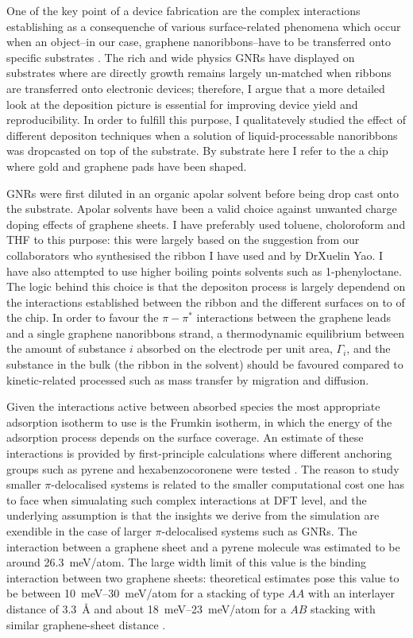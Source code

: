 One of the key point of a device fabrication are the complex interactions establishing as a consequenche of various surface-related phenomena which occur when an object--in our case, graphene nanoribbons--have to be transferred onto specific substrates \cite{nerngchamnong2013role, huskens2004model}. The rich and wide physics \glspl{GNR} have displayed on substrates where are directly growth remains largely un-matched when ribbons are transferred onto electronic devices; therefore, I argue that a more detailed look at the deposition picture is essential for improving device yield and reproducibility. In order to fulfill this purpose, I qualitatevely studied the effect of different depositon techniques when a solution of liquid-processable nanoribbons was dropcasted on top of the substrate. By substrate here I refer to the a chip where gold and graphene pads have been shaped.

\glspl{GNR} were first diluted in an organic apolar solvent before being drop cast onto the substrate. Apolar solvents have been a valid choice against unwanted charge doping effects of graphene sheets. I have preferably used toluene, choloroform and \gls{THF} to this purpose: this were largely based on the suggestion from our collaborators who synthesised the ribbon I have used and by Dr\. Xuelin Yao. I have also attempted to use higher boiling points solvents such as 1-phenyloctane. The logic behind this choice is that the depositon process is largely dependend on the interactions established between the ribbon and the different surfaces on to of the chip. In order to favour the $\pi-\pi^*$ interactions between the graphene leads and a single graphene nanoribbons strand, a thermodynamic equilibrium between the amount of substance $i$ absorbed on the electrode per unit area, $\Gamma_i$, and the substance in the bulk (the ribbon in the solvent) should be favoured compared to kinetic-related processed such as mass transfer by migration and diffusion.

Given the interactions active between absorbed species the most appropriate adsorption isotherm to use is the Frumkin isotherm, in which the energy of the adsorption process depends on the surface coverage. An estimate of these interactions is provided by first-principle calculations where different anchoring groups such as pyrene and hexabenzocoronene were tested \cite{limburg2018anchor}. The reason to study smaller $\pi$-delocalised systems is related to the smaller computational cost one has to face when simualating such complex interactions at DFT level, and the underlying assumption is that the insights we derive from the simulation are exendible in the case of larger $\pi$-delocalised systems such as \glspl{GNR}.
The interaction between a graphene sheet and a pyrene molecule was estimated to be around \SI{26.3}{\milli\electronvolt}/atom. The large width limit of this value is the binding interaction between two graphene sheets: theoretical estimates pose this value to be between \SIrange{10}{30}{\milli\electronvolt}/atom for a stacking of type $AA$ with an interlayer distance of \SI{3.3}{\angstrom} and about \SIrange{18}{23}{\milli\electronvolt}/atom for a $AB$ stacking with similar graphene-sheet distance \cite{mostaani2015quantum}.

